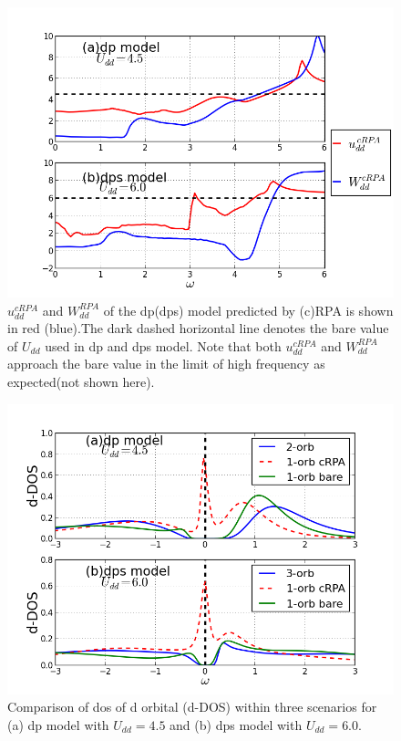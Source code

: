 \documentclass[10pt]{ruthesis}
\begin{document}
{\begin{figure}[th]
 \includegraphics[width=\columnwidth]{./plotForpublishing/dp+pds_Udduw.png}
 \caption{\label{fig4}$u^{cRPA}_{dd}$ and $W^{RPA}_{dd}$ of the dp(dps) model predicted by (c)RPA is shown in red (blue).The dark dashed horizontal line denotes the bare value of $U_{dd}$ used in dp and dps model. Note that both $u^{cRPA}_{dd}$ and $W^{RPA}_{dd}$ approach the bare value in the limit of high frequency as expected(not shown here). }
\end{figure}
\begin{figure}[th]
 \includegraphics[width=\columnwidth]{./plotForpublishing/doscmp_barecRPA.png}
 \caption{\label{fig5}Comparison of dos of d orbital (d-DOS) within three scenarios for (a) dp model with $U_{dd}=4.5 $ and (b) dps model with $U_{dd}=6.0$.}
\end{figure}

}
\end{document}
